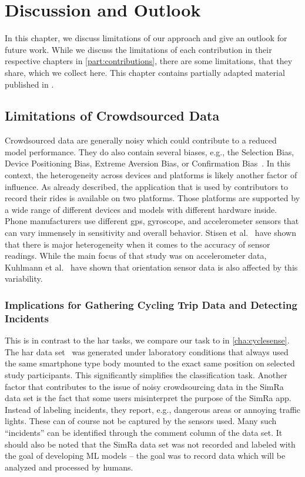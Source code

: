 \chapter{Discussion and Outlook}
\label{cha:discussion_and_outlook}
In this chapter, we discuss limitations of our approach and give an outlook for future work.
While we discuss the limitations of each contribution in their respective chapters in \cref{part:contributions}, there are some limitations, that they share, which we collect here.
This chapter contains partially adapted material published in \cite{karakaya2020simra,karakaya2022cyclesense,karakaya2022realistic,karakaya2023achieving,karakaya2023crowdsensing}.

\section{Limitations of Crowdsourced Data}
\label{sec:limitations_of_crowdsourced_data}
Crowdsourced data are generally noisy which could contribute to a reduced model performance.
They do also contain several biases, e.g., the Selection Bias, Device Positioning Bias, Extreme Aversion Bias, or Confirmation Bias~\cite{basiri2019crowdsourced, chakraborty2017makes, kahneman1991anomalies}.
In this context, the heterogeneity across devices and platforms is likely another factor of influence.
As already described, the application that is used by contributors to record their rides is available on two platforms. 
Those platforms are supported by a wide range of different devices and models with different hardware inside. 
Phone manufacturers use different \ac{gps}, gyroscope, and accelerometer sensors that can vary immensely in sensitivity and overall behavior.
Stisen et al.~\cite{stisen2015smart} have shown that there is major heterogeneity when it comes to the accuracy of sensor readings. 
While the main focus of that study was on accelerometer data, Kuhlmann et al.~\cite{kuhlmann2021smartphone} have shown that orientation sensor data is also affected by this variability.
\subsection*{Implications for Gathering Cycling Trip Data and Detecting Incidents}
This is in contrast to the \ac{har} tasks, we compare our task to in \cref{cha:cyclesense}.
The \ac{har} data set~\cite{anguita2013public} was generated under laboratory conditions that always used the same smartphone type body mounted to the exact same position on selected study participants.
This significantly simplifies the classification task.
Another factor that contributes to the issue of noisy crowdsourcing data in the SimRa data set is the fact that some users misinterpret the purpose of the SimRa app.
Instead of labeling incidents, they report, e.g., dangerous areas or annoying traffic lights.
These can of course not be captured by the sensors used.
Many such ``incidents'' can be identified through the comment column of the data set.
It should also be noted that the SimRa data set was not recorded and labeled with the goal of developing ML models -- the goal was to record data which will be analyzed and processed by humans.


